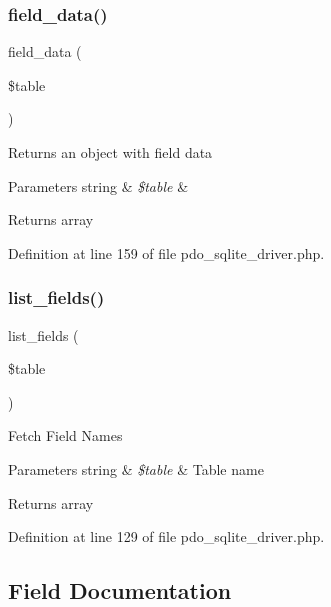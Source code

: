 \subsubsection{\texorpdfstring{field\_data()}{field\_data()}}
{\footnotesize\ttfamily field\+\_\+data (\begin{DoxyParamCaption}\item[{}]{\$table }\end{DoxyParamCaption})}

Returns an object with field data


\begin{DoxyParams}[1]{Parameters}
string & {\em \$table} & \\
\hline
\end{DoxyParams}
\begin{DoxyReturn}{Returns}
array 
\end{DoxyReturn}


Definition at line 159 of file pdo\+\_\+sqlite\+\_\+driver.\+php.

\mbox{\label{class_c_i___d_b__pdo__sqlite__driver_aef08cd376b16b24608100ca0e3f2f85b}} 
\subsubsection{\texorpdfstring{list\_fields()}{list\_fields()}}
{\footnotesize\ttfamily list\+\_\+fields (\begin{DoxyParamCaption}\item[{}]{\$table }\end{DoxyParamCaption})}

Fetch Field Names


\begin{DoxyParams}[1]{Parameters}
string & {\em \$table} & Table name \\
\hline
\end{DoxyParams}
\begin{DoxyReturn}{Returns}
array 
\end{DoxyReturn}


Definition at line 129 of file pdo\+\_\+sqlite\+\_\+driver.\+php.



\subsection{Field Documentation}
\mbox{\label{class_c_i___d_b__pdo__sqlite__driver_a10213aa6e05f6d924d3277bb1d2fea00}} 
